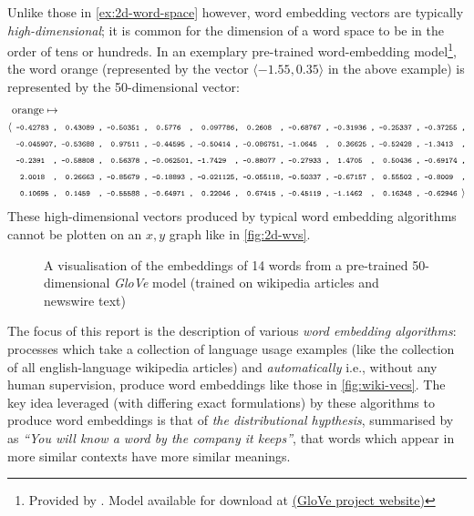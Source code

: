 \documentclass{ucetd}
\begin{document}
Unlike those in \autoref{ex:2d-word-space} however, word embedding vectors are typically \emph{high-dimensional}; it is common for the dimension of a word space to be in the order of tens or hundreds. In an exemplary pre-trained word-embedding model\footnote{Provided by \textcite{pennington2014glove}. Model available for download at \href{https://nlp.stanford.edu/projects/glove/}{(GloVe project website)}}, the word orange (represented by the vector $\langle -1.55, 0.35\rangle$ in the above example) is represented by the 50-dimensional vector:
\begin{align*}
  &\text{orange}\mapsto\\
  \text{\small{$\langle$}}
  &\texttt{\scriptsize ~-0.42783~,~~0.43089~,~-0.50351~,~~0.5776~~,~~0.097786,~~0.2608~~,~-0.68767~,~-0.31936~,~-0.25337~,~-0.37255~,}\\
  &\texttt{\scriptsize ~-0.045907,~-0.53688~,~~0.97511~,~-0.44595~,~-0.50414~,~-0.086751,~-1.0645~~,~~0.36625~,~-0.52428~,~-1.3413~~,}\\
  &\texttt{\scriptsize ~-0.2391~~,~-0.58808~,~~0.56378~,~-0.062501,~-1.7429~~,~-0.88077~,~-0.27933~,~~1.4705~~,~~0.50436~,~-0.69174~,}\\
  &\texttt{\scriptsize ~~2.0018~~,~~0.26663~,~-0.85679~,~-0.18893~,~-0.021125,~-0.055118,~-0.50337~,~-0.67157~,~~0.55502~,~-0.8009~~,}\\
  &\texttt{\scriptsize ~~0.10695~,~~0.1459~~,~-0.55588~,~-0.64971~,~~0.22046~,~~0.67415~,~-0.45119~,~-1.1462~~,~~0.16348~,~-0.62946~}
  \text{\small{$\rangle$}}
\end{align*}\label{fig:orange-vec}
These high-dimensional vectors produced by typical word embedding algorithms cannot be plotten on an $x,y$ graph like in \autoref{fig:2d-wvs}.

\begin{figure}[!ht]
  \captionsetup{width=.95\linewidth}
 \centering
 
 \caption{A visualisation of the embeddings of 14 words from a pre-trained 50-dimensional \emph{GloVe} model (trained on wikipedia articles and newswire text)}
 \centering
\end{figure}\label{fig:wiki-vecs}
The focus of this report is the description of various \emph{word embedding algorithms}: processes which take a collection of language usage examples (like the collection of all english-language wikipedia articles) and \emph{automatically} i.e., without any human supervision, produce word embeddings like those in \autoref{fig:wiki-vecs}. The key idea leveraged (with differing exact formulations) by these algorithms to produce word embeddings is that of \emph{the distributional hypthesis}, summarised by \textcite{firth-1957-a-syn-of-lin} as \emph{``You will know a word by the company it keeps''}, that words which appear in more similar contexts have more similar meanings. 
\end{document}
